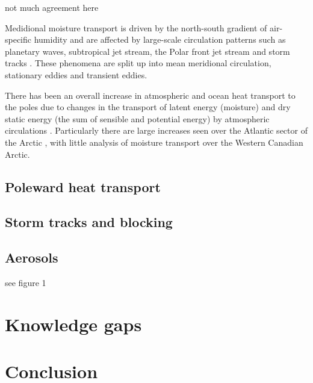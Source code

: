 \documentclass[11pt, oneside]{article}
\begin{document}
not much agreement here 

Medidional moisture transport is driven by the north-south gradient of air-specific humidity and are affected by large-scale circulation patterns such as planetary waves, subtropical jet stream, the Polar front jet stream and storm tracks \cite{gimeno2019atmospheric}. These phenomena are split up into mean meridional circulation, stationary eddies and transient eddies. 

There has been an overall increase in atmospheric and ocean heat transport to the poles due to changes in the transport of latent energy (moisture) and dry static energy (the sum of sensible and potential energy) by atmospheric circulations \cite{mcgraw2020changes}. Particularly there are large increases seen over the Atlantic sector of the Arctic \cite{dufour2016atmospheric}, with little analysis of moisture transport over the Western Canadian Arctic. 

\subsection{Poleward heat transport}
\subsection{Storm tracks and blocking}
\subsection{Aerosols}
see figure 1 \cite{vihma2016atmospheric}
\section{Knowledge gaps}
\section{Conclusion}






 {}

\end{document}
